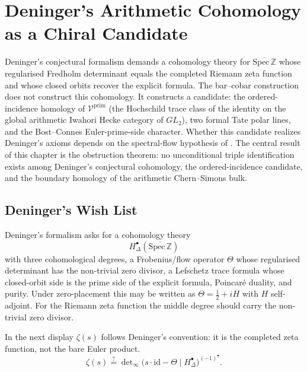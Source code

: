 \chapter{Deninger's Arithmetic Cohomology as a Chiral Candidate}
\label{v4-arith:w8-a:deninger-chiral-homology}

Deninger's conjectural formalism demands a cohomology theory for
\(\overline{\mathrm{Spec}\,\mathbb{Z}}\) whose regularised Fredholm
determinant equals the completed Riemann zeta function and whose closed
orbits recover the explicit formula. The bar--cobar construction does not
construct this cohomology. It constructs a candidate: the
ordered-incidence homology of \(\mathcal{V}^{\mathrm{prim}}\) (the
Hochschild trace class of the identity on the global arithmetic Iwahori
Hecke category of \(GL_2\)), two formal Tate polar lines, and the
Bost--Connes Euler-prime-side character. Whether this candidate realizes
Deninger's axioms depends on the spectral-flow hypothesis of
. The central result of this
chapter is the obstruction theorem: no unconditional triple
identification exists among Deninger's conjectural cohomology, the
ordered-incidence candidate, and the boundary homology of the
arithmetic Chern--Simons bulk.

\section{Deninger's Wish List}
\label{v4-arith:w8-a:deninger-wishlist}

Deninger's formalism asks for a cohomology theory
\[
H^\bullet_\Delta(\overline{\mathrm{Spec}\,\mathbb Z})
\]
with three cohomological degrees, a Frobenius/flow operator \(\Theta\)
whose regularised determinant has the non-trivial zero divisor, a
Lefschetz trace formula whose closed-orbit side is the prime side of
the explicit formula, Poincar\'{e} duality, and purity. Under
zero-placement this may be written as
\(\Theta=\tfrac12+iH\) with \(H\) self-adjoint. For the Riemann zeta
function the middle degree should carry the non-trivial zero divisor.

In the next display \(\zeta(s)\) follows Deninger's convention: it is
the completed zeta function, not the bare Euler product.
\begin{equation}
\label{v4-arith:w8-a:eq:deninger-det}
\zeta(s)
\stackrel{?}{=}
\det\nolimits_\infty
\bigl(s\cdot\mathrm{id}-\Theta\mid
H^\bullet_\Delta\bigr)^{(-1)^\bullet}.
\end{equation}

